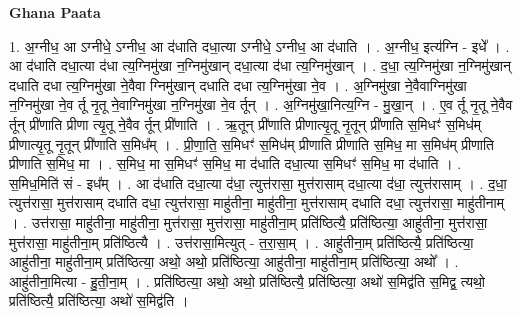 \documentclass[17pt]{extarticle}
\begin{document}
\textbf{Ghana Paata } \newline

1. अ॒ग्नीध॒ आ ऽग्नीधे॒ ऽग्नीध॒ आ द॑धाति दधा॒त्या ऽग्नीधे॒ ऽग्नीध॒ आ द॑धाति । . अ॒ग्नीध॒ इत्य॑ग्नि - इधे᳚ । . आ द॑धाति दधा॒त्या द॑धा त्य॒ग्निमु॑खा न॒ग्निमु॑खान् दधा॒त्या द॑धा त्य॒ग्निमु॑खान् । . द॒धा॒ त्य॒ग्निमु॑खा न॒ग्निमु॑खान् दधाति दधा त्य॒ग्निमु॑खा ने॒वैवा ग्निमु॑खान् दधाति दधा त्य॒ग्निमु॑खा ने॒व । . अ॒ग्निमु॑खा ने॒वैवाग्निमु॑खा न॒ग्निमु॑खा ने॒व र्तू नृ॒तू ने॒वाग्निमु॑खा न॒ग्निमु॑खा ने॒व र्तून् । . अ॒ग्निमु॑खा॒नित्य॒ग्नि - मु॒खा॒न् । . ए॒व र्तू नृ॒तू ने॒वैव र्तून् प्री॑णाति प्रीणा त्यृ॒तू ने॒वैव र्तून् प्री॑णाति । . ऋ॒तून् प्री॑णाति प्रीणात्यृ॒तू नृ॒तून् प्री॑णाति स॒मिधꣳ॑ स॒मिध॑म् प्रीणात्यृ॒तू नृ॒तून् प्री॑णाति स॒मिध᳚म् । . प्री॒णा॒ति॒ स॒मिधꣳ॑ स॒मिध॑म् प्रीणाति प्रीणाति स॒मिध॒ मा स॒मिध॑म् प्रीणाति प्रीणाति स॒मिध॒ मा । . स॒मिध॒ मा स॒मिधꣳ॑ स॒मिध॒ मा द॑धाति दधा॒त्या स॒मिधꣳ॑ स॒मिध॒ मा द॑धाति । . स॒मिध॒मिति॑ सं - इध᳚म् । . आ द॑धाति दधा॒त्या द॑धा॒ त्युत्त॑रासा॒ मुत्त॑रासाम् दधा॒त्या द॑धा॒ त्युत्त॑रासाम् । . द॒धा॒ त्युत्त॑रासा॒ मुत्त॑रासाम् दधाति दधा॒ त्युत्त॑रासा॒ माहु॑तीना॒ माहु॑तीना॒ मुत्त॑रासाम् दधाति दधा॒ त्युत्त॑रासा॒ माहु॑तीनाम् । . उत्त॑रासा॒ माहु॑तीना॒ माहु॑तीना॒ मुत्त॑रासा॒ मुत्त॑रासा॒ माहु॑तीना॒म् प्रति॑ष्ठित्यै॒ प्रति॑ष्ठित्या॒ आहु॑तीना॒ मुत्त॑रासा॒ मुत्त॑रासा॒ माहु॑तीना॒म् प्रति॑ष्ठित्यै । . उत्त॑रासा॒मित्युत् - त॒रा॒सा॒म् । . आहु॑तीना॒म् प्रति॑ष्ठित्यै॒ प्रति॑ष्ठित्या॒ आहु॑तीना॒ माहु॑तीना॒म् प्रति॑ष्ठित्या॒ अथो॒ अथो॒ प्रति॑ष्ठित्या॒ आहु॑तीना॒ माहु॑तीना॒म् प्रति॑ष्ठित्या॒ अथो᳚ । . आहु॑तीना॒मित्या - हु॒ती॒ना॒म् । . प्रति॑ष्ठित्या॒ अथो॒ अथो॒ प्रति॑ष्ठित्यै॒ प्रति॑ष्ठित्या॒ अथो॑ स॒मिद्व॑ति स॒मिद्व॒ त्यथो॒ प्रति॑ष्ठित्यै॒ प्रति॑ष्ठित्या॒ अथो॑ स॒मिद्व॑ति । \newline
\end{document}
